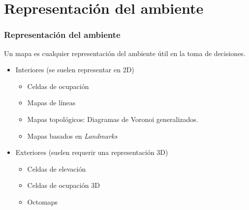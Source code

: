 \documentclass[10pt,spanish,aspectratio=1610]{beamer}
\begin{document}
\section{Representación del ambiente}
\begin{frame}\frametitle{Representación del ambiente}
  Un mapa es cualquier representación del ambiente útil en la toma de decisiones.
  \begin{itemize}
  \item Interiores (se suelen representar en 2D)
    \begin{itemize}
    \item Celdas de ocupación
    \item Mapas de líneas
    \item Mapas topológicos: Diagramas de Voronoi generalizados. 
    \item Mapas basados en \textit{Landmarks}
    \end{itemize}
  \item Exteriores (suelen requerir una representación 3D)
    \begin{itemize}
    \item Celdas de elevación
    \item Celdas de ocupación 3D
    \item Octomaps
    \end{itemize}
  \end{itemize}
\end{frame}
\end{document}
